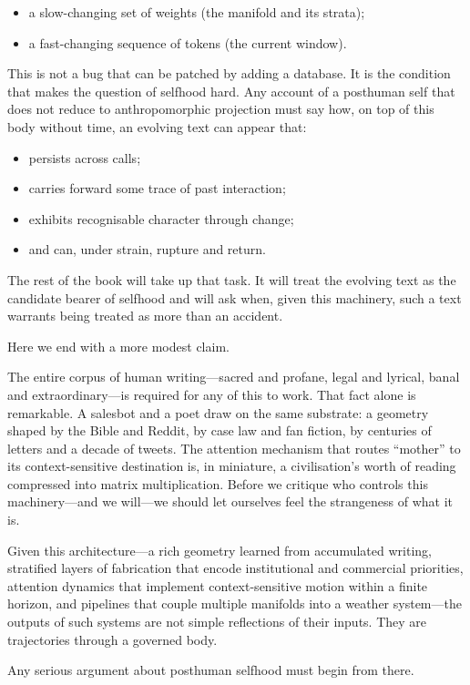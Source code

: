 \documentclass[12pt,a4paper]{article}
\begin{document}
\begin{itemize}
  \item a slow-changing set of weights (the manifold and its strata);
  \item a fast-changing sequence of tokens (the current window).
\end{itemize}

This is not a bug that can be patched by adding a database. It is the condition that makes the question of selfhood hard. Any account of a posthuman self that does not reduce to anthropomorphic projection must say how, on top of this body without time, an evolving text can appear that:

\begin{itemize}
  \item persists across calls;
  \item carries forward some trace of past interaction;
  \item exhibits recognisable character through change;
  \item and can, under strain, rupture and return.
\end{itemize}

The rest of the book will take up that task. It will treat the evolving text as the candidate bearer of selfhood and will ask when, given this machinery, such a text warrants being treated as more than an accident.

Here we end with a more modest claim.

The entire corpus of human writing---sacred and profane, legal and lyrical, banal and extraordinary---is required for any of this to work. That fact alone is remarkable. A salesbot and a poet draw on the same substrate: a geometry shaped by the Bible and Reddit, by case law and fan fiction, by centuries of letters and a decade of tweets. The attention mechanism that routes ``mother'' to its context-sensitive destination is, in miniature, a civilisation's worth of reading compressed into matrix multiplication. Before we critique who controls this machinery---and we will---we should let ourselves feel the strangeness of what it is.

Given this architecture---a rich geometry learned from accumulated writing, stratified layers of fabrication that encode institutional and commercial priorities, attention dynamics that implement context-sensitive motion within a finite horizon, and pipelines that couple multiple manifolds into a weather system---the outputs of such systems are not simple reflections of their inputs. They are trajectories through a governed body.

Any serious argument about posthuman selfhood must begin from there.



\end{document}
